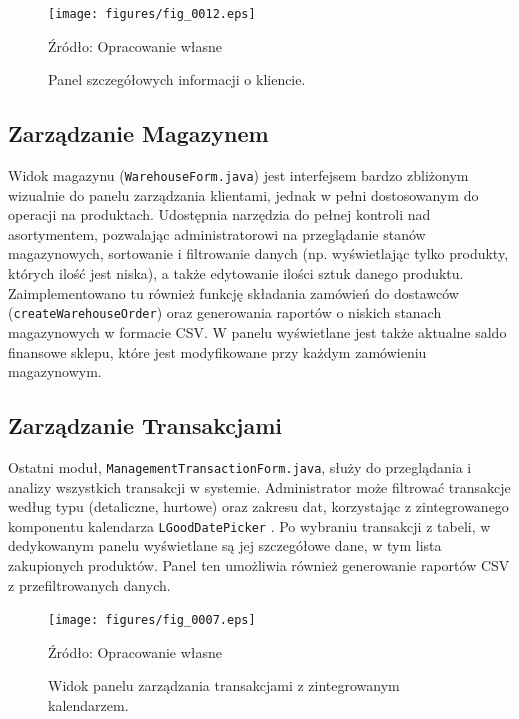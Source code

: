 \begin{figure}[H]
    \centering
    \texttt{[image: figures/fig\_0012.eps]}
    \caption{Panel szczegółowych informacji o kliencie.}
    \label{fig:customer_details}
    \small{Źródło: Opracowanie własne}
\end{figure}
\clearpage

\subsection{Zarządzanie Magazynem}
Widok magazynu (\texttt{WarehouseForm.java}) jest interfejsem bardzo zbliżonym wizualnie do panelu zarządzania klientami, jednak w pełni dostosowanym do operacji na produktach. Udostępnia narzędzia do pełnej kontroli nad asortymentem, pozwalając administratorowi na przeglądanie stanów magazynowych, sortowanie i filtrowanie danych (np. wyświetlając tylko produkty, których ilość jest niska), a także edytowanie ilości sztuk danego produktu. Zaimplementowano tu również funkcję składania zamówień do dostawców (\texttt{createWarehouseOrder}) oraz generowania raportów o niskich stanach magazynowych w formacie CSV. W panelu wyświetlane jest także aktualne saldo finansowe sklepu, które jest modyfikowane przy każdym zamówieniu magazynowym.

\subsection{Zarządzanie Transakcjami}
Ostatni moduł, \texttt{ManagementTransactionForm.java}, służy do przeglądania i analizy wszystkich transakcji w systemie. Administrator może filtrować transakcje według typu (detaliczne, hurtowe) oraz zakresu dat, korzystając z zintegrowanego komponentu kalendarza \texttt{LGoodDatePicker} \cite{LGoodDatePicker}. Po wybraniu transakcji z tabeli, w dedykowanym panelu wyświetlane są jej szczegółowe dane, w tym lista zakupionych produktów. Panel ten umożliwia również generowanie raportów CSV z przefiltrowanych danych.

\begin{figure}[H]
    \centering
    \texttt{[image: figures/fig\_0007.eps]}
    \caption{Widok panelu zarządzania transakcjami z zintegrowanym kalendarzem.}
    \label{fig:management_transaction}
    \small{Źródło: Opracowanie własne}
\end{figure}
\clearpage
